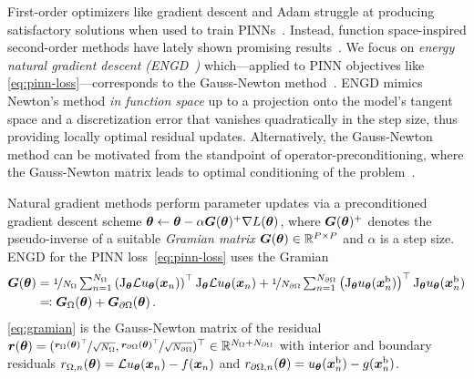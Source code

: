 First-order optimizers like gradient descent and Adam struggle at producing satisfactory solutions when used to train PINNs~\citep{cuomo2022scientific}.
Instead, function space-inspired second-order methods have lately shown promising results~\citep{muller2024optimization}.
We focus on \emph{energy natural gradient descent (ENGD~\cite{muller2023achieving})} which---applied to PINN objectives like \eqref{eq:pinn-loss}---corresponds to the Gauss-Newton method~\cite[][Chapter 6.3]{bottou2016machine}.
ENGD mimics Newton's method \emph{in function space} up to a projection onto the model's tangent space and a discretization error that vanishes quadratically in the step size, thus providing locally optimal residual updates.
Alternatively, the Gauss-Newton method can be motivated from the standpoint of operator-preconditioning, where the Gauss-Newton matrix leads to optimal conditioning of the problem~\citep{de2023operator}.

Natural gradient methods perform parameter updates via a preconditioned gradient descent scheme ${\bm{\theta}} \leftarrow {\bm{\theta}} - \alpha {\bm{G}}({\bm{\theta}})^+\nabla L({\bm{\theta}})$, where ${\bm{G}}({\bm{\theta}})^+$ denotes the pseudo-inverse of a suitable \emph{Gramian matrix} ${\bm{G}}({\bm{\theta}}) \in {\mathbb{R}}^{P \times P}$ and $\alpha$ is a step size.
ENGD for the PINN loss~\eqref{eq:pinn-loss} uses the Gramian
\begin{align}\label{eq:gramian}
  \begin{split}
    {\bm{G}}({\bm{\theta}})
    &=
      \nicefrac{1}{N_\Omega}
      \textstyle
      \sum_{n=1}^{N_\Omega}
      \left( \mathrm{J}_{{\bm{\theta}}} \mathcal{L} u_{\bm{\theta}}({\bm{x}}_n) \right)^\top
      \mathrm{J}_{{\bm{\theta}}} \mathcal{L} u_{\bm{\theta}}({\bm{x}}_n)
      +
      \nicefrac{1}{N_{\partial\Omega}}
      \textstyle
      \sum_{n=1}^{N_{\partial\Omega}}
      \left(\mathrm{J}_{{\bm{\theta}}} u_{\bm{\theta}}({\bm{x}}_n^\text{b})  \right)^\top
      \mathrm{J}_{{\bm{\theta}}} u_{\bm{\theta}} ({\bm{x}}_n^\text{b})
    \\
    &\eqqcolon {\bm{G}}_\Omega({\bm{\theta}}) + {\bm{G}}_{\partial\Omega}({\bm{\theta}})\,.
  \end{split}
\end{align}
\eqref{eq:gramian} is the Gauss-Newton matrix of the residual ${\bm{r}}({\bm{\theta}}) = (\nicefrac{{\bm{r}}_\Omega({\bm{\theta}})^{\top}}{\sqrt{N_\Omega}}, \nicefrac{{\bm{r}}_{\partial\Omega}({\bm{\theta}})^{\top}}{\sqrt{N_{\partial\Omega}}} )^\top \in {\mathbb{R}}^{N_{\Omega} + N_{\partial\Omega}}$ with interior and boundary residuals $r_{\Omega,n}({\bm{\theta}}) = \mathcal{L} u_{\bm{\theta}}({\bm{x}}_n) - f({\bm{x}}_n)$ and $r_{\partial\Omega,n}({\bm{\theta}}) = u_{\bm{\theta}}({\bm{x}}_n^\text{b}) - g({\bm{x}}_n^\text{b})$.

